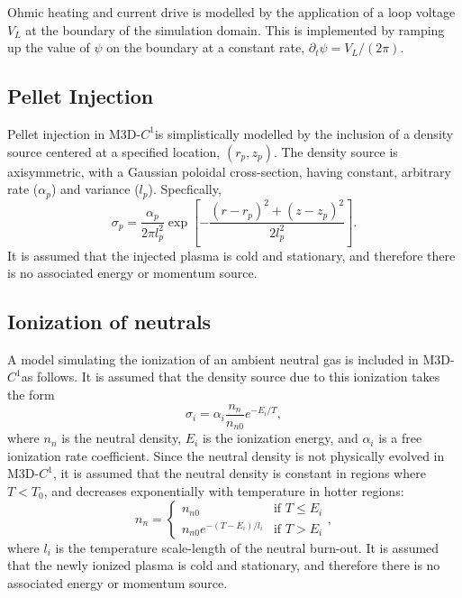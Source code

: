 \documentclass[draft]{book}
\newcommand{\codename}{M3D-$C^1$}
\begin{document}
Ohmic heating and current drive is modelled by the application of a
loop voltage $V_L$ at the boundary of the simulation domain.  This is
implemented by ramping up the value of $\psi$ on the boundary at a
constant rate, $\partial_t \psi = V_L/(2 \pi)$.

\subsection{Pellet Injection \label{sec:pellet_injection}}

Pellet injection in \codename is simplistically modelled by the
inclusion of a density source centered at a specified location, $(r_p,
z_p)$.  The density source is axisymmetric, with a Gaussian poloidal
cross-section, having constant, arbitrary rate ($\alpha_p$) and
variance ($l_p$).  Specfically,
\begin{equation}
  \sigma_p = \frac{\alpha_{p}}{2 \pi l_{p}^2}
  \exp \left[ -\frac{(r-r_p)^2 + (z-z_p)^2}{2 l_p^2}\right].
\end{equation}
It is assumed that the injected plasma is cold and stationary, and
therefore there is no associated energy or momentum source.


\subsection{Ionization of neutrals \label{sec:ionization}}

A model simulating the ionization of an ambient neutral gas is
included in \codename as follows.  It is assumed that the density
source due to this ionization takes the form
\begin{equation}
  \sigma_i = \alpha_i \frac{n_n}{n_{n 0}} e^{-E_i / T},
\end{equation}
where $n_n$ is the neutral density, $E_i$ is the ionization energy,
and $\alpha_i$ is a free ionization rate coefficient.  Since the
neutral density is not physically evolved in \codename, it is assumed
that the neutral density is constant in regions where $T < T_0$, and
decreases exponentially with temperature in hotter regions:
\begin{equation}
  n_n =
  \begin{cases}
    n_{n 0} & \text{if $T \le E_i$}\\
    n_{n 0} e^{-(T - E_i) / l_i} & \text{if $T > E_i$}
  \end{cases},
\end{equation}
where $l_i$ is the temperature scale-length of the neutral burn-out.
It is assumed that the newly ionized plasma is cold and stationary,
and therefore there is no associated energy or momentum source.
\end{document}
